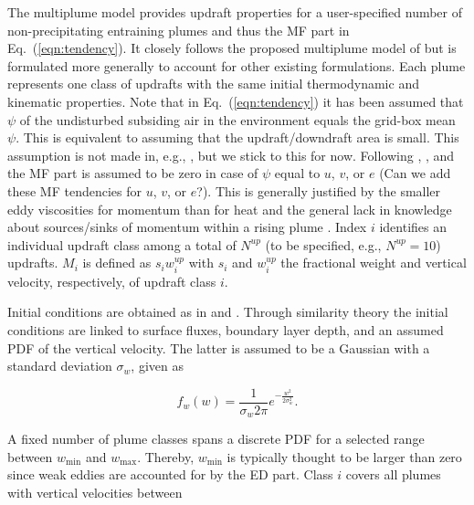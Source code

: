\documentclass[dvipdfmx,a4paper,10pt]{article}
\begin{document}
The multiplume model provides updraft properties for a user-specified number of non-precipitating entraining plumes and thus the MF part in Eq.~(\ref{eqn:tendency}). It closely follows the proposed multiplume model of \cite{cheinet03a} but is formulated more generally to account for other existing formulations. Each plume represents one class of updrafts with the same initial thermodynamic and kinematic properties. Note that in Eq.~(\ref{eqn:tendency}) it has been assumed that $\psi$ of the undisturbed subsiding air in the environment equals the grid-box mean $\psi$. This is equivalent to assuming that the updraft/downdraft area is small. This assumption is not made in, e.g., \cite{cheinet03a}, but we stick to this for now. Following \cite{suselj12}, \cite{suselj13}, and \cite{suselj14} the MF part is assumed to be zero in case of $\psi$ equal to $u$, $v$, or $e$ {\color{blue}(Can we add these MF tendencies for $u$, $v$, or $e$?)}. This is generally justified by the smaller eddy viscosities for momentum than for heat and the general lack in knowledge about sources/sinks of momentum within a rising plume \citep[see, e.g., discussion in][]{han15}. Index $i$ identifies an individual updraft class among a total of $N^{up}$ (to be specified, e.g., $N^{up}=10$) updrafts. $M_i$ is defined as $s_i w^{up}_i$ with $s_i$ and $w^{up}_i$ the fractional weight and vertical velocity, respectively, of updraft class $i$. 


Initial conditions are obtained as in \cite{cheinet03a} and \cite{lenschow80}. Through similarity theory the initial conditions are linked to surface fluxes, boundary layer depth, and an assumed PDF of the vertical velocity. The latter is assumed to be a Gaussian with a standard deviation $\sigma_w$, given as

\begin{equation}
 f_w(w) = \frac{1}{\sigma_w 2 \pi } e^{-\frac{w^2}{2\sigma_w^2}}.
\end{equation}


A fixed number of plume classes spans a discrete PDF for a selected range between $w_{\mathrm{min}}$ and $w_{\mathrm{max}}$. Thereby, $w_{\mathrm{min}}$ is typically thought to be larger than zero since weak eddies are accounted for by the ED part. Class $i$ covers all plumes with vertical velocities between
\end{document}
